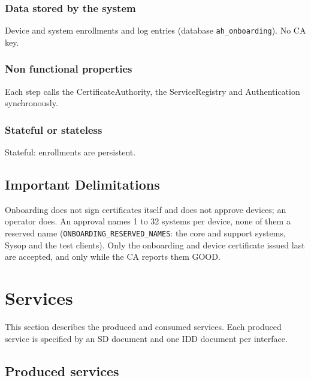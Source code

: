 \documentclass[a4paper]{arrowhead}
\begin{document}
\subsubsection{Data stored by the system}

Device and system enrollments and log entries (database \texttt{ah\_\allowbreak{}onboarding}). No CA key.

\subsubsection{Non functional properties}

Each step calls the Certificate\allowbreak{}Authority, the ServiceRegistry and Authentication synchronously.

\subsubsection{Stateful or stateless}

Stateful: enrollments are persistent.

\subsection{Important Delimitations}
\label{sec:delimitations}

Onboarding does not sign certificates itself and does not approve devices; an operator does. An approval names 1 to 32 systems per device, none of them a reserved name (\texttt{ONBOARDING\_\allowbreak{}RESERVED\_\allowbreak{}NAMES}: the core and support systems, Sysop and the test clients). Only the onboarding and device certificate issued last are accepted, and only while the CA reports them GOOD.

\newpage

\section{Services}
\label{sec:services}

This section describes the produced and consumed services. Each produced service is specified by an SD document and one IDD document per interface.

\subsection{Produced services}
\end{document}
